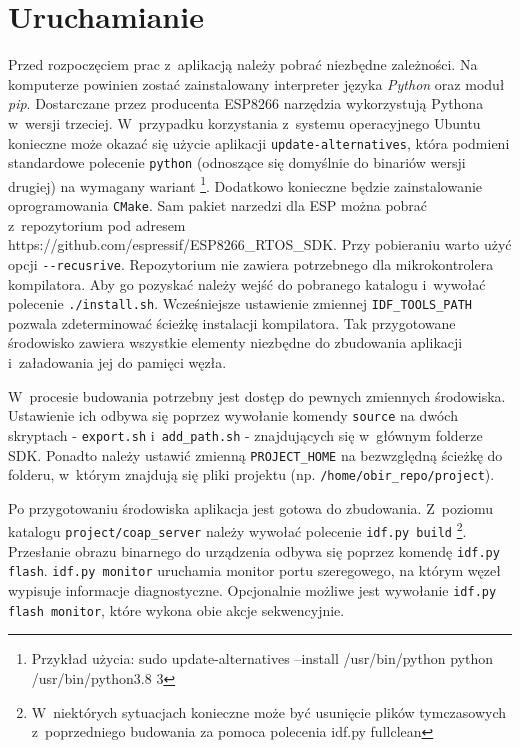 \section{Uruchamianie}

Przed rozpoczęciem prac z~aplikacją należy pobrać niezbędne zależności. Na komputerze powinien zostać zainstalowany interpreter języka \textit{Python} oraz moduł \textit{pip}. Dostarczane przez producenta ESP8266 narzędzia wykorzystują Pythona w~wersji trzeciej. W~przypadku korzystania z~systemu operacyjnego Ubuntu konieczne może okazać się użycie aplikacji \verb|update-alternatives|, która podmieni standardowe polecenie \verb|python| (odnoszące się domyślnie do binariów wersji drugiej) na wymagany wariant \footnote{Przykład użycia: sudo update-alternatives --install /usr/bin/python python /usr/bin/python3.8 3}. Dodatkowo konieczne będzie zainstalowanie oprogramowania \verb|CMake|. Sam pakiet narzedzi dla ESP można pobrać z~repozytorium pod adresem https://github.com/espressif/ESP8266\_RTOS\_SDK. Przy pobieraniu warto użyć opcji \verb|--recusrive|. Repozytorium nie zawiera potrzebnego dla mikrokontrolera kompilatora. Aby go pozyskać należy wejść do pobranego katalogu i~wywołać polecenie \verb|./install.sh|. Wcześniejsze ustawienie zmiennej \verb|IDF_TOOLS_PATH| pozwala zdeterminować ścieżkę instalacji kompilatora. Tak przygotowane środowisko zawiera wszystkie elementy niezbędne do zbudowania aplikacji i~załadowania jej do pamięci węzła.

W~procesie budowania potrzebny jest dostęp do pewnych zmiennych środowiska. Ustawienie ich odbywa się poprzez wywołanie komendy \verb|source| na dwóch skryptach - \verb|export.sh| i~\verb|add_path.sh| - znajdujących się w~głównym folderze SDK. Ponadto należy ustawić zmienną \verb|PROJECT_HOME| na bezwzględną ścieżkę do folderu, w~którym znajdują się pliki projektu (np. \verb|/home/obir_repo/project|).

Po przygotowaniu środowiska aplikacja jest gotowa do zbudowania. Z~poziomu katalogu \verb|project/coap_server| należy wywołać polecenie \verb|idf.py build| \footnote{W~niektórych sytuacjach konieczne może być usunięcie plików tymczasowych z~poprzedniego budowania za pomoca polecenia idf.py fullclean}. Przesłanie obrazu binarnego do urządzenia odbywa się poprzez komendę \verb|idf.py flash|. \verb|idf.py monitor| uruchamia monitor portu szeregowego, na którym węzeł wypisuje informacje diagnostyczne. Opcjonalnie możliwe jest wywołanie \verb|idf.py flash monitor|, które wykona obie akcje sekwencyjnie.
